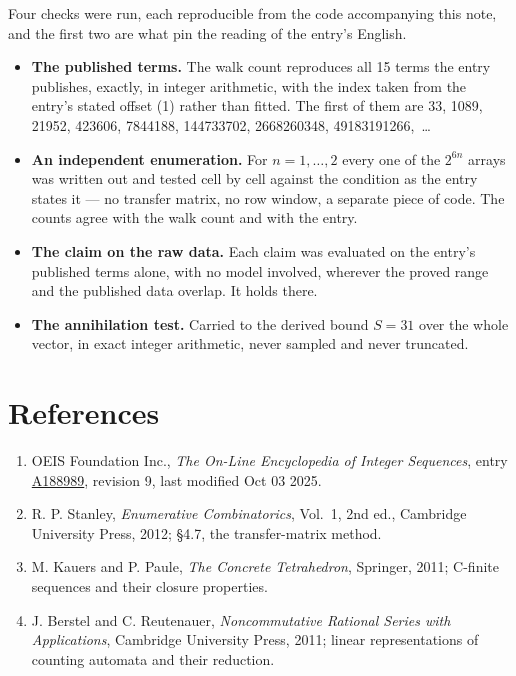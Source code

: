 \documentclass[11pt]{article}
\theoremstyle{definition}
\begin{document}
Four checks were run, each reproducible from the code accompanying this note, and the first two are what pin the reading of the entry's English.

\begin{itemize}

\item {\bfseries The published terms.} The walk count reproduces all 15 terms the entry publishes, exactly, in integer arithmetic, with the index taken from the entry's stated offset (1) rather than fitted. The first of them are 33, 1089, 21952, 423606, 7844188, 144733702, 2668260348, 49183191266,~\dots

\item {\bfseries An independent enumeration.} For $n = 1,\dots,2$ every one of the $2^{6n}$ arrays was written out and tested cell by cell against the condition as the entry states it --- no transfer matrix, no row window, a separate piece of code. The counts agree with the walk count and with the entry.

\item {\bfseries The claim on the raw data.} Each claim was evaluated on the entry's published terms alone, with no model involved, wherever the proved range and the published data overlap. It holds there.

\item {\bfseries The annihilation test.} Carried to the derived bound $S = 31$ over the whole vector, in exact integer arithmetic, never sampled and never truncated.

\end{itemize}

\section{References}

\begin{enumerate}

\item OEIS Foundation Inc., \emph{The On-Line Encyclopedia of Integer Sequences}, entry \href{https://oeis.org/A188989}{A188989}, revision 9, last modified Oct 03 2025.

\item R. P. Stanley, \emph{Enumerative Combinatorics}, Vol.~1, 2nd ed., Cambridge University Press, 2012; \S4.7, the transfer-matrix method.

\item M. Kauers and P. Paule, \emph{The Concrete Tetrahedron}, Springer, 2011; C-finite sequences and their closure properties.

\item J. Berstel and C. Reutenauer, \emph{Noncommutative Rational Series with Applications}, Cambridge University Press, 2011; linear representations of counting automata and their reduction.

\end{enumerate}
\end{document}

